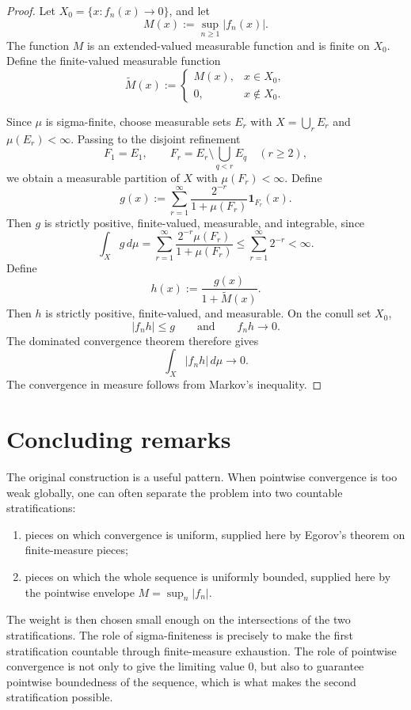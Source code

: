 \documentclass[11pt]{article}
\newcommand{\one}{\mathbf 1}
\theoremstyle{plain}
\theoremstyle{definition}
\theoremstyle{remark}
\begin{document}
\begin{proof}
Let $X_0=\{x:f_n(x)\to 0\}$, and let
\[
        M(x):=\sup_{n\geq 1}|f_n(x)|.
\]
The function $M$ is an extended-valued measurable function and is finite on
$X_0$.  Define the finite-valued measurable function
\[
        \widetilde M(x):=
        \begin{cases}
        M(x), & x\in X_0,\\
        0, & x\notin X_0.
        \end{cases}
\]

Since $\mu$ is sigma-finite, choose measurable sets $E_r$ with
$X=\bigcup_r E_r$ and $\mu(E_r)<\infty$.  Passing to the disjoint refinement
\[
        F_1=E_1,
        \qquad
        F_r=E_r\setminus\bigcup_{q<r}E_q\quad(r\geq 2),
\]
we obtain a measurable partition of $X$ with $\mu(F_r)<\infty$.  Define
\[
        g(x):=\sum_{r=1}^\infty
        \frac{2^{-r}}{1+\mu(F_r)}\one_{F_r}(x).
\]
Then $g$ is strictly positive, finite-valued, measurable, and integrable,
since
\[
        \int_X g\,d\mu
        =
        \sum_{r=1}^\infty
        \frac{2^{-r}\mu(F_r)}{1+\mu(F_r)}
        \leq
        \sum_{r=1}^\infty 2^{-r}<\infty.
\]
Define
\[
        h(x):=\frac{g(x)}{1+\widetilde M(x)}.
\]
Then $h$ is strictly positive, finite-valued, and measurable.  On the conull
set $X_0$,
\[
        |f_nh|
        \leq g
        \qquad\text{and}\qquad
        f_nh\to 0.
\]
The dominated convergence theorem therefore gives
\[
        \int_X |f_nh|\,d\mu\to 0.
\]
The convergence in measure follows from Markov's inequality.
\end{proof}

\section{Concluding remarks}

The original construction is a useful pattern.  When pointwise convergence is
too weak globally, one can often separate the problem into two countable
stratifications:
\begin{enumerate}[label=\textup{(\roman*)},leftmargin=2.5em]
    \item pieces on which convergence is uniform, supplied here by Egorov's
    theorem on finite-measure pieces;
    \item pieces on which the whole sequence is uniformly bounded, supplied
    here by the pointwise envelope $M=\sup_n |f_n|$.
\end{enumerate}
The weight is then chosen small enough on the intersections of the two
stratifications.  The role of sigma-finiteness is precisely to make the first
stratification countable through finite-measure exhaustion.  The role of
pointwise convergence is not only to give the limiting value $0$, but also to
guarantee pointwise boundedness of the sequence, which is what makes the
second stratification possible.
\end{document}
